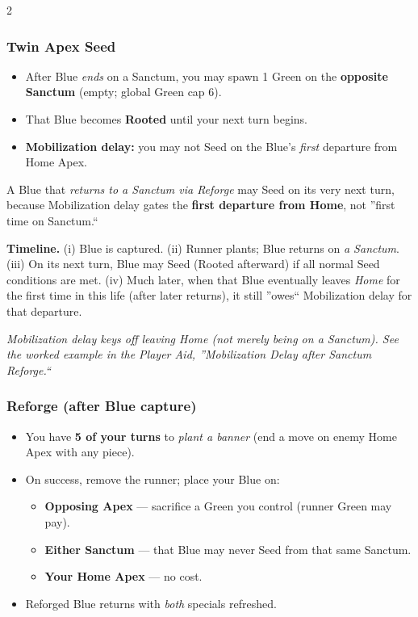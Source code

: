\documentclass[11pt]{article}
\begin{document}
\begin{multicols}{2}
\columnbreak

\subsubsection*{Twin Apex Seed}
\begin{itemize}[leftmargin=1.1em,itemsep=0.2em]
  \item After Blue \emph{ends} on a Sanctum, you may spawn 1 Green on the \textbf{opposite Sanctum} (empty; global Green cap 6).
  \item That Blue becomes \textbf{Rooted} until your next turn begins.
  \item \textbf{Mobilization delay:} you may not Seed on the Blue's \emph{first} departure from Home Apex.
\end{itemize}

\begin{tcolorbox}[enhanced,breakable,title={Worked Example --- Mobilization Delay after Sanctum Reforge},
  colback=white,colframe=royal,boxrule=0.8pt]
\small
A Blue that \emph{returns to a Sanctum via Reforge} may Seed on its very next turn, because Mobilization delay gates the \textbf{first departure from Home}, not ''first time on Sanctum.``

\textbf{Timeline.} (i) Blue is captured. (ii) Runner plants; Blue returns on \emph{a Sanctum}. (iii) On its next turn, Blue may Seed (Rooted afterward) if all normal Seed conditions are met. (iv) Much later, when that Blue eventually leaves \emph{Home} for the first time in this life (after later returns), it still ''owes`` Mobilization delay for that departure.
\end{tcolorbox}

\noindent\textit{Mobilization delay keys off leaving Home (not merely being on a Sanctum). See the worked example in the Player Aid, ''Mobilization Delay after Sanctum Reforge.``}

\subsubsection*{Reforge (after Blue capture)}
\begin{itemize}[leftmargin=1.1em,itemsep=0.2em]
  \item You have \textbf{5 of your turns} to \emph{plant a banner} (end a move on enemy Home Apex with any piece).
  \item On success, remove the runner; place your Blue on:
  \begin{itemize}[leftmargin=1.1em,itemsep=0.15em]
    \item \textbf{Opposing Apex} --- sacrifice a Green you control (runner Green may pay).
    \item \textbf{Either Sanctum} --- that Blue may never Seed from that same Sanctum.
    \item \textbf{Your Home Apex} --- no cost.
  \end{itemize}
  \item Reforged Blue returns with \emph{both} specials refreshed.
\end{itemize}


\end{multicols}
\end{document}
